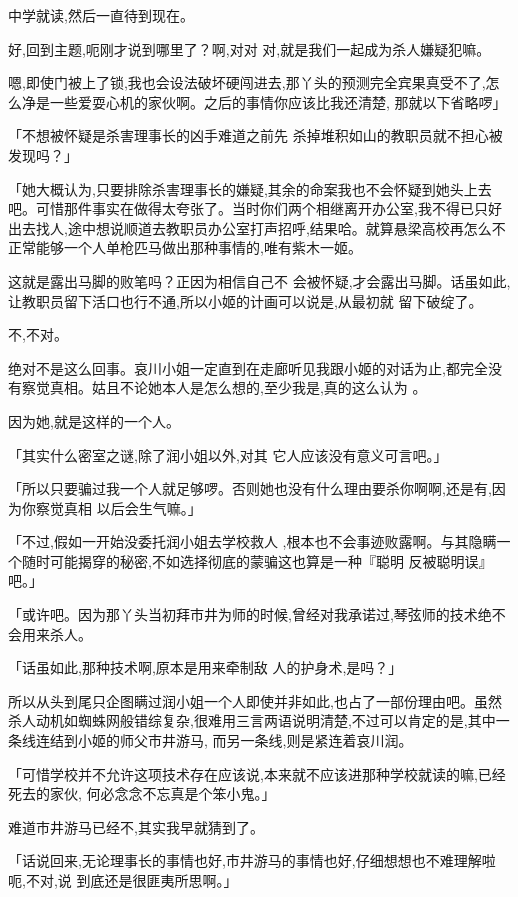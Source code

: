 \documentclass{article}
\begin{document}
中学就读,然后一直待到现在。 

好,回到主题,呃刚才说到哪里了？啊,对对
对,就是我们一起成为杀人嫌疑犯嘛。 

嗯,即使门被上了锁,我也会设法破坏硬闯进去,那丫头的预测完全宾果真受不了,怎么净是一些爱耍心机的家伙啊。之后的事情你应该比我还清楚,
那就以下省略啰」 

「不想被怀疑是杀害理事长的凶手难道之前先
杀掉堆积如山的教职员就不担心被发现吗？」 

「她大概认为,只要排除杀害理事长的嫌疑,其余的命案我也不会怀疑到她头上去吧。可惜那件事实在做得太夸张了。当时你们两个相继离开办公室,我不得已只好出去找人,途中想说顺道去教职员办公室打声招呼,结果哈。就算悬梁高校再怎么不正常能够一个人单枪匹马做出那种事情的,唯有紫木一姬。

这就是露出马脚的败笔吗？正因为相信自己不
\newpage
会被怀疑,才会露出马脚。话虽如此,让教职员留下活口也行不通,所以小姬的计画可以说是,从最初就
留下破绽了。 


不,不对。 

绝对不是这么回事。哀川小姐一定直到在走廊听见我跟小姬的对话为止,都完全没有察觉真相。姑且不论她本人是怎么想的,至少我是,真的这么认为
。 


因为她,就是这样的一个人。 

「其实什么密室之谜,除了润小姐以外,对其
它人应该没有意义可言吧。」 

「所以只要骗过我一个人就足够啰。否则她也没有什么理由要杀你啊啊,还是有,因为你察觉真相
以后会生气嘛。」 

「不过,假如一开始没委托润小姐去学校救人
\newpage
,根本也不会事迹败露啊。与其隐瞒一个随时可能揭穿的秘密,不如选择彻底的蒙骗这也算是一种『聪明
反被聪明误』吧。」 

「或许吧。因为那丫头当初拜市井为师的时候,曾经对我承诺过,琴弦师的技术绝不会用来杀人。

「话虽如此,那种技术啊,原本是用来牵制敌
人的护身术,是吗？」 

所以从头到尾只企图瞒过润小姐一个人即使并非如此,也占了一部份理由吧。虽然杀人动机如蜘蛛网般错综复杂,很难用三言两语说明清楚,不过可以肯定的是,其中一条线连结到小姬的师父市井游马,
而另一条线,则是紧连着哀川润。 

「可惜学校并不允许这项技术存在应该说,本来就不应该进那种学校就读的嘛,已经死去的家伙,
何必念念不忘真是个笨小鬼。」 


\newpage

难道市井游马已经不,其实我早就猜到了。 

「话说回来,无论理事长的事情也好,市井游马的事情也好,仔细想想也不难理解啦呃,不对,说
到底还是很匪夷所思啊。」 
\end{document}
